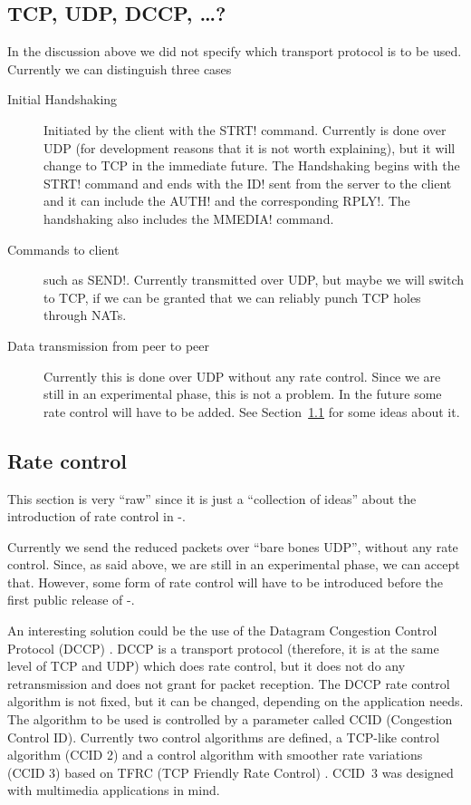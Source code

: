 \documentclass{medusabook}
\begin{document}
\begin{subappendices}
\section{TCP, UDP, DCCP, \ldots ?}
\label{sect:1.5;medusa_book}

In the discussion above we did not specify which transport protocol is
to be used.  Currently we can distinguish three cases

\begin{description}
  \item[Initial Handshaking] Initiated by the client with the \ttt STRT!
  command.  Currently is done over UDP (for development reasons that
  it is not worth explaining), but it will change to TCP in the
  immediate future.  The Handshaking begins with the \ttt STRT!
  command and ends with the \ttt ID! sent from the server to the
  client and it can include the \ttt AUTH! and the corresponding \ttt
  RPLY!.  The handshaking also includes the \ttt MMEDIA! command.
  \item[Commands to client] such as \ttt SEND!. Currently transmitted
  over UDP, but maybe we will switch to TCP, if we can be granted that
  we can reliably punch TCP holes through NATs.
  \item[Data transmission from peer to peer] Currently this is done
  over UDP without any rate control.  Since we are still in an
  experimental phase, this is not a problem.  In the future some rate
  control will have to be added.  See Section~\ref{sec:rate-control}
  for some ideas about it.
\end{description}

\subsection{Rate control}
\label{sec:rate-control}

This section is very ``raw'' since it is just a ``collection of
ideas'' about the introduction of rate control in \medusa-.

Currently we send the reduced packets over ``bare bones UDP'', without
any rate control.  Since, as said above, we are still in an
experimental phase, we can accept that.  However, some form of rate
control will have to be introduced before the first public release of
\medusa-.

An interesting solution could be the use of the Datagram Congestion
Control Protocol (DCCP) \cite{rfc4340}. DCCP is a transport protocol
(therefore, it is at the same level of TCP and UDP) which does rate
control, but it does not do any retransmission and does not grant for
packet reception.  The DCCP rate control algorithm is not fixed, but
it can be changed, depending on the application needs. The algorithm
to be used is controlled by a parameter called CCID (Congestion
Control ID).  Currently two control algorithms are defined, a TCP-like
control algorithm (CCID 2) \cite{rfc4341} and a control algorithm with
smoother rate variations (CCID 3) \cite{rfc4342} based on TFRC (TCP
Friendly Rate Control) \cite{rfc3448}.  CCID~3 was designed with
multimedia applications in mind.


\end{subappendices}
\end{document}
